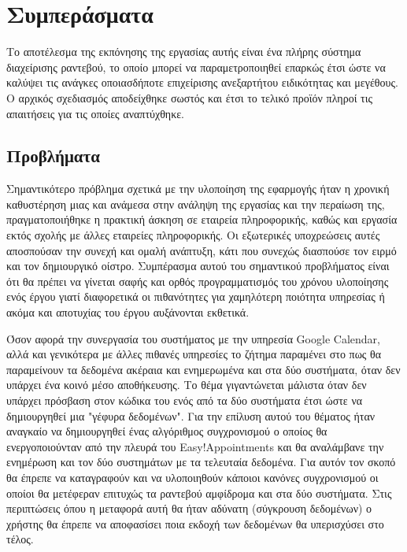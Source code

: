 \chapter{Συμπεράσματα}
Το αποτέλεσμα της εκπόνησης της εργασίας αυτής είναι ένα πλήρης σύστημα διαχείρισης ραντεβού, το οποίο μπορεί να παραμετροποιηθεί επαρκώς έτσι ώστε να καλύψει τις ανάγκες οποιασδήποτε επιχείρισης ανεξαρτήτου ειδικότητας και μεγέθους. Ο αρχικός σχεδιασμός αποδείχθηκε σωστός και έτσι το τελικό προϊόν πληροί τις απαιτήσεις για τις οποίες αναπτύχθηκε. 

\section{Προβλήματα}
Σημαντικότερο πρόβλημα σχετικά με την υλοποίηση της εφαρμογής ήταν η χρονική καθυστέρηση μιας και ανάμεσα στην ανάληψη της εργασίας και την περαίωση της, πραγματοποιήθηκε η πρακτική άσκηση σε εταιρεία πληροφορικής, καθώς και εργασία εκτός σχολής με άλλες εταιρείες πληροφορικής. Οι εξωτερικές υποχρεώσεις αυτές αποσπούσαν την συνεχή και ομαλή ανάπτυξη, κάτι που συνεχώς διασπούσε τον ειρμό και τον δημιουργικό οίστρο. Συμπέρασμα αυτού του σημαντικού προβλήματος είναι ότι θα πρέπει να γίνεται σαφής και ορθός προγραμματισμός του χρόνου υλοποίησης ενός έργου γιατί διαφορετικά οι πιθανότητες για χαμηλότερη ποιότητα υπηρεσίας ή ακόμα και αποτυχίας του έργου αυξάνονται εκθετικά.

Όσον αφορά την συνεργασία του συστήματος με την υπηρεσία Google Calendar, αλλά και γενικότερα με άλλες πιθανές υπηρεσίες το ζήτημα παραμένει στο πως θα παραμείνουν τα δεδομένα ακέραια και ενημερωμένα και στα δύο συστήματα, όταν δεν υπάρχει ένα κοινό μέσο αποθήκευσης. Το θέμα γιγαντώνεται μάλιστα όταν δεν υπάρχει πρόσβαση στον κώδικα του ενός από τα δύο συστήματα έτσι ώστε να δημιουργηθεί μια "γέφυρα δεδομένων". Για την επίλυση αυτού του θέματος ήταν αναγκαίο να δημιουργηθεί ένας αλγόριθμος συγχρονισμού ο οποίος θα ενεργοποιούνταν από την πλευρά του Easy!Appointments και θα αναλάμβανε την ενημέρωση και τον δύο συστημάτων με τα τελευταία δεδομένα. Για αυτόν τον σκοπό θα έπρεπε να καταγραφούν και να υλοποιηθούν κάποιοι κανόνες συγχρονισμού οι οποίοι θα μετέφεραν επιτυχώς τα ραντεβού αμφίδρομα και στα δύο συστήματα. Στις περιπτώσεις όπου η μεταφορά αυτή θα ήταν αδύνατη (σύγκρουση δεδομένων) ο χρήστης θα έπρεπε να αποφασίσει ποια εκδοχή των δεδομένων θα υπερισχύσει στο τέλος.

